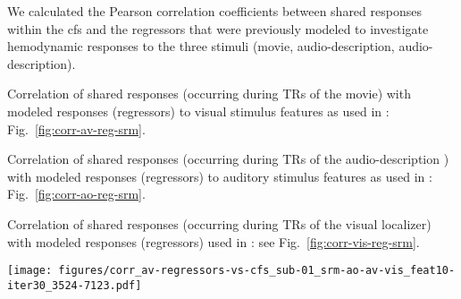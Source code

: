 




We calculated the Pearson correlation coefficients between shared responses
within the \ac{cfs} and the regressors that were previously modeled
\citep{sengupta2016extension, haeusler2022processing} to investigate hemodynamic
responses to the three stimuli (movie, audio-description, audio-description).

%
Correlation of shared responses (occurring during TRs of the movie) with modeled
responses (regressors) to visual stimulus features as used in
\citet{haeusler2022processing}: Fig.~\ref{fig:corr-av-reg-srm}.

%
Correlation of shared responses (occurring during TRs of the audio-description )
with modeled responses (regressors) to auditory stimulus features as used in
\citet{haeusler2022processing}: Fig.~\ref{fig:corr-ao-reg-srm}.

%
Correlation of shared responses (occurring during TRs of the visual localizer)
with modeled responses (regressors) used in \citet{sengupta2016extension}: see
Fig.~\ref{fig:corr-vis-reg-srm}.




\begin{figure*}[tbp]
\centering
    \texttt{[image: figures/corr\_av-regressors-vs-cfs\_sub-01\_srm-ao-av-vis\_feat10-iter30\_3524-7123.pdf]}
    \caption{
    \textbf{Correlations of shared responses and regressors of the movie.}
    Pearson correlation coefficients between a) shared responses (sh. res.)
    within the \ac{cfs} that was calculated for subject 01 and b) regressors
    created in \citet{haeusler2022processing} to model hemodynamic responses to
    stimulus features of the movie.
    The time series of the \ac{cfs} were sliced to match the TRs of the
    movie.
    }
    \label{fig:corr-av-reg-srm}
\end{figure*}



